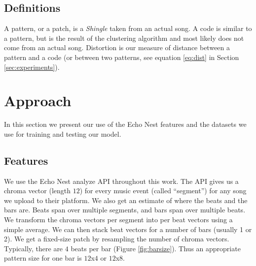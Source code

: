 \documentclass{article}
\begin{document}
\subsection{Definitions}
A pattern, or a patch, is a \textit{Shingle} taken from an actual song.
A code is similar to a pattern, but is the result of the clustering
algorithm and most likely does not come from an actual song.
Distortion is our measure of distance between a pattern and a code
(or between two patterns, see equation \ref{eq:dist} in Section 
\ref{sec:experiments}).

\section{Approach}\label{sec:approach}
In this section we present our use of the Echo Nest features and the
datasets we use for training and testing our model.

\subsection{Features}
We use the Echo Nest analyze API \cite{EchoNest} throughout this work.
The API gives us a chroma vector (length $12$) for every music event (called 
``segment'') for any song we upload to their platform. 
We also get an estimate of where the beats and the bars are. Beats span over
multiple segments, and bars span over multiple beats. 
We transform the chroma vectors per segment into per beat vectors using a 
simple average. We can then stack beat vectors for a number of bars 
(usually 1 or 2). 
We get a fixed-size patch by resampling the number of chroma vectors. Typically,
there are $4$ beats per bar (Figure \ref{fig:barsize}). 
Thus an appropriate pattern size for one bar
is $12$x$4$ or $12$x$8$.
\end{document}
